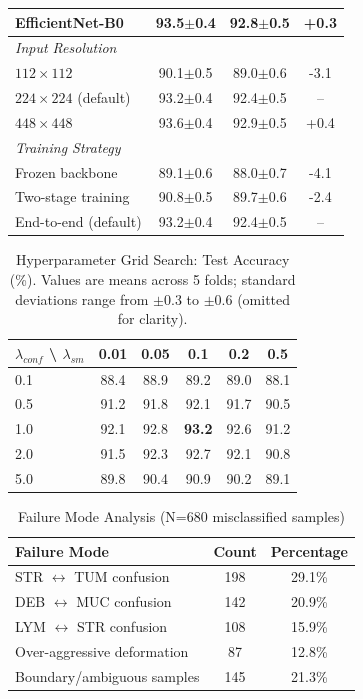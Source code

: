 \documentclass[pdflatex,sn-nature]{sn-jnl}%
\theoremstyle{thmstyleone}%
\theoremstyle{thmstyletwo}%
\theoremstyle{thmstylethree}%
\begin{document}
\begin{table}[t]
\begin{tabularx}{\textwidth}{Xccc}
\quad EfficientNet-B0 & 93.5$\pm$0.4 & 92.8$\pm$0.5 & +0.3 \\
\hline
\multicolumn{4}{l}{\textit{Input Resolution}} \\
\quad $112 \times 112$ & 90.1$\pm$0.5 & 89.0$\pm$0.6 & -3.1 \\
\quad $224 \times 224$ (default) & 93.2$\pm$0.4 & 92.4$\pm$0.5 & -- \\
\quad $448 \times 448$ & 93.6$\pm$0.4 & 92.9$\pm$0.5 & +0.4 \\
\hline
\multicolumn{4}{l}{\textit{Training Strategy}} \\
\quad Frozen backbone & 89.1$\pm$0.6 & 88.0$\pm$0.7 & -4.1 \\
\quad Two-stage training & 90.8$\pm$0.5 & 89.7$\pm$0.6 & -2.4 \\
\quad End-to-end (default) & 93.2$\pm$0.4 & 92.4$\pm$0.5 & -- \\
\hline
\end{tabularx}
\end{table}
\begin{table}[t]
\centering
\caption{Hyperparameter Grid Search: Test Accuracy (\%). Values are means across 5 folds; standard deviations range from $\pm$0.3 to $\pm$0.6 (omitted for clarity).}
\label{tab:hyperparameter}
\begin{tabularx}{\textwidth}{X|ccccc}
\hline
$\lambda_{conf}$ \textbackslash{} $\lambda_{sm}$ & 0.01 & 0.05 & 0.1 & 0.2 & 0.5 \\
\hline
0.1 & 88.4 & 88.9 & 89.2 & 89.0 & 88.1 \\
0.5 & 91.2 & 91.8 & 92.1 & 91.7 & 90.5 \\
1.0 & 92.1 & 92.8 & \textbf{93.2} & 92.6 & 91.2 \\
2.0 & 91.5 & 92.3 & 92.7 & 92.1 & 90.8 \\
5.0 & 89.8 & 90.4 & 90.9 & 90.2 & 89.1 \\
\hline
\end{tabularx}
\end{table}
\begin{table}[t]
\centering
\caption{Failure Mode Analysis (N=680 misclassified samples)}
\label{tab:failure}
\begin{tabularx}{\textwidth}{Xcc}
\hline
\textbf{Failure Mode} & \textbf{Count} & \textbf{Percentage} \\
\hline
STR $\leftrightarrow$ TUM confusion & 198 & 29.1\% \\
DEB $\leftrightarrow$ MUC confusion & 142 & 20.9\% \\
LYM $\leftrightarrow$ STR confusion & 108 & 15.9\% \\
Over-aggressive deformation & 87 & 12.8\% \\
Boundary/ambiguous samples & 145 & 21.3\% \\
\hline
\end{tabularx}
\end{table}
\end{document}
